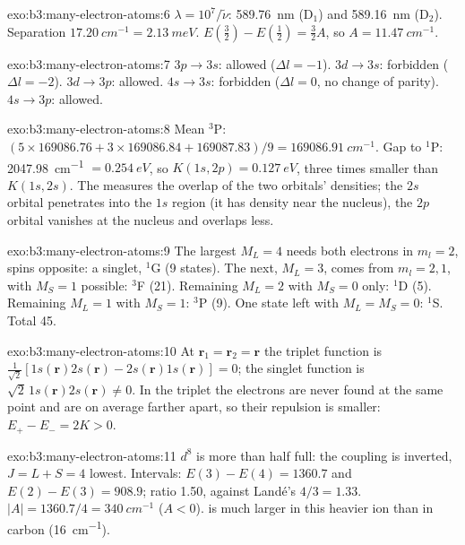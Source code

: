 \begin{solution}{exo:b3:many-electron-atoms:6}
$\lambda = 10^7/\tilde\nu$: \qty{589.76}{nm} (D$_1$) and \qty{589.16}{nm}
(D$_2$). Separation $\qty{17.20}{cm^{-1}} = \qty{2.13}{meV}$. $E(\frac32) -
E(\frac12) = \frac32A$, so $A = \qty{11.47}{cm^{-1}}$.
\end{solution}

\begin{solution}{exo:b3:many-electron-atoms:7}
$3p \to 3s$: allowed ($\Delta l = -1$). $3d \to 3s$: forbidden ($\Delta l = -2$).
$3d \to 3p$: allowed. $4s \to 3s$: forbidden ($\Delta l = 0$, no change of
parity). $4s \to 3p$: allowed.
\end{solution}

\begin{solution}{exo:b3:many-electron-atoms:8}
Mean ${}^3$P: $(5 \times 169086.76 + 3 \times 169086.84 + 169087.83)/9 =
\qty{169086.91}{cm^{-1}}$. Gap to ${}^1$P: \qty{2047.98}{cm^{-1}} $=
\qty{0.254}{eV}$, so $K(1s,2p) = \qty{0.127}{eV}$, three times smaller than
$K(1s,2s)$. The  measures the overlap of the two orbitals'
densities; the $2s$ orbital penetrates into the $1s$ region (it has density
near the nucleus), the $2p$ orbital vanishes at the nucleus and overlaps less.
\end{solution}

\begin{solution}{exo:b3:many-electron-atoms:9}
The largest $M_L = 4$ needs both electrons in $m_l = 2$, spins opposite: a
singlet, ${}^1$G (9 states). The next, $M_L = 3$, comes from $m_l = 2, 1$, with
$M_S = 1$ possible: ${}^3$F (21). Remaining $M_L = 2$ with $M_S = 0$ only:
${}^1$D (5). Remaining $M_L = 1$ with $M_S = 1$: ${}^3$P (9). One state left with
$M_L = M_S = 0$: ${}^1$S. Total 45.
\end{solution}

\begin{solution}{exo:b3:many-electron-atoms:10}
At $\mathbf r_1 = \mathbf r_2 = \mathbf r$ the triplet function is
$\frac{1}{\sqrt2}[1s(\mathbf r)2s(\mathbf r) - 2s(\mathbf r)1s(\mathbf r)] = 0$; the
singlet function is $\sqrt2\,1s(\mathbf r)2s(\mathbf r) \ne 0$. In the triplet the
electrons are never found at the same point and are on average farther
apart, so their repulsion is smaller: $E_+ - E_- = 2K > 0$.
\end{solution}

\begin{solution}{exo:b3:many-electron-atoms:11}
$d^8$ is more than half full: the coupling is inverted, $J = L + S = 4$
lowest. Intervals: $E(3) - E(4) = 1360.7$ and $E(2) - E(3) = 908.9$; ratio
1.50, against Landé's $4/3 = 1.33$. $|A| = 1360.7/4 = \qty{340}{cm^{-1}}$
($A < 0$).  is much larger in this heavier ion than in
carbon (\qty{16}{cm^{-1}}).
\end{solution}

